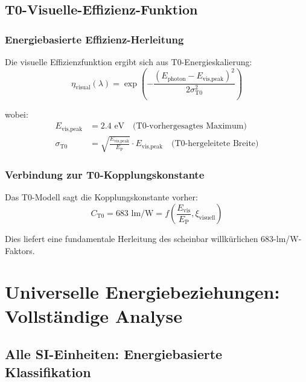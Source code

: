 \documentclass[12pt,a4paper]{article}
\newcommand{\xipar}{\xi}
\newcommand{\EP}{E_{\text{P}}}
\newcommand{\Evis}{E_{\text{vis}}}
\newcommand{\Cto}{C_{\text{T0}}}
\newcommand{\etavis}{\eta_{\text{visual}}}
\begin{document}
	\subsection{T0-Visuelle-Effizienz-Funktion}
	\label{subsec:t0_visuelle_effizienz}
	
	\subsubsection{Energiebasierte Effizienz-Herleitung}
	\label{subsubsec:energie_effizienz_herleitung}
	
	Die visuelle Effizienzfunktion ergibt sich aus T0-Energieskalierung:
	\begin{equation}
		\etavis(\lambda) = \exp\left(-\frac{(E_{\text{photon}} - E_{\text{vis,peak}})^2}{2\sigma_{\text{T0}}^2}\right)
		\label{eq:t0_visuelle_effizienz}
	\end{equation}
	
	wobei:
	\begin{align}
		E_{\text{vis,peak}} &= 2.4 \text{ eV} \quad \text{(T0-vorhergesagtes Maximum)} \\
		\sigma_{\text{T0}} &= \sqrt{\frac{E_{\text{vis,peak}}}{\EP}} \cdot E_{\text{vis,peak}} \quad \text{(T0-hergeleitete Breite)}
	\end{align}
	
	\subsubsection{Verbindung zur T0-Kopplungskonstante}
	\label{subsubsec:t0_kopplungskonstante}
	
	Das T0-Modell sagt die Kopplungskonstante vorher:
	\begin{equation}
		\Cto = 683 \text{ lm/W} = f\left(\frac{\Evis}{\EP}, \xipar_{\text{visuell}}\right)
		\label{eq:t0_kopplungsvorhersage}
	\end{equation}
	
	Dies liefert eine fundamentale Herleitung des scheinbar willkürlichen 683-lm/W-Faktors.
	
	\section{Universelle Energiebeziehungen: Vollständige Analyse}
	\label{sec:universelle_energiebeziehungen}
	
	\subsection{Alle SI-Einheiten: Energiebasierte Klassifikation}
	\label{subsec:alle_si_energiebasiert}
	
\end{document}
